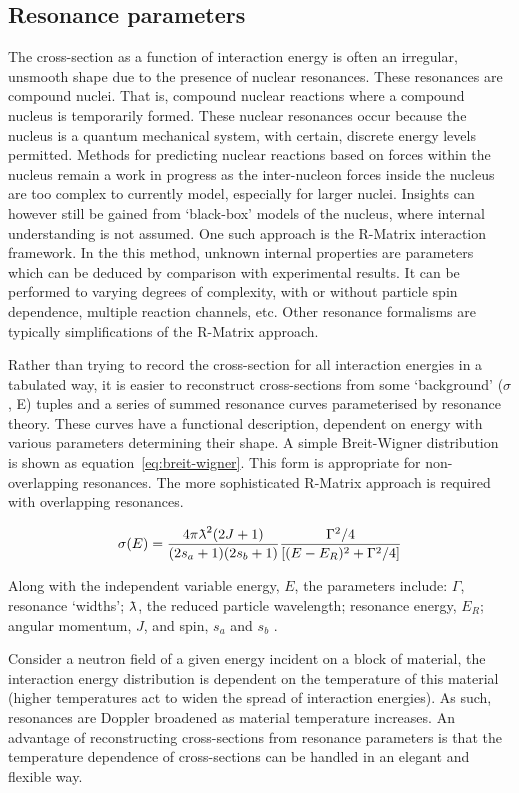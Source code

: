 \subsection{Resonance parameters}
The cross-section as a function of interaction energy is often an irregular, unsmooth shape due to the presence of nuclear resonances. These resonances are compound nuclei. That is, compound nuclear reactions where a compound nucleus is temporarily formed. These nuclear resonances occur because the nucleus is a quantum mechanical system, with certain, discrete energy levels permitted. Methods for predicting nuclear reactions based on forces within the nucleus remain a work in progress as the inter-nucleon forces inside the nucleus are too complex to currently model, especially for larger nuclei. Insights can however still be gained from `black-box' models of the nucleus, where internal understanding is not assumed. One such approach is the R-Matrix interaction framework. In the this method, unknown internal properties are parameters which can be deduced by comparison with experimental results. It can be performed to varying degrees of complexity, with or without particle spin dependence, multiple reaction channels, etc. Other resonance formalisms are typically simplifications of the R-Matrix approach.

Rather than trying to record the cross-section for all interaction energies in a tabulated way, it is easier to reconstruct cross-sections from some `background' ($\sigma$, E) tuples and a series of summed resonance curves parameterised by resonance theory. These curves have a functional description, dependent on energy with various parameters determining their shape. A simple Breit-Wigner distribution is shown as equation~\ref{eq:breit-wigner}. This form is appropriate for non-overlapping resonances. The more sophisticated R-Matrix approach is required with overlapping resonances. 

\begin{equation}
  \sigma(E) = \frac{4\pi\lambdabar^{2}(2J + 1)}{(2s_{a} + 1)(2s_{b} + 1)}  \frac{\Gamma^{2}/4}{[(E-E_{R})^{2} + \Gamma^{2}/4]}
  \label{eq:breit-wigner}
\end{equation}

Along with the independent variable energy, $E$, the parameters include: $\Gamma$, resonance `widths'; $\lambdabar$, the reduced particle wavelength; resonance energy, $E_{R}$; angular momentum, $J$, and spin, $s_{a}$ and $s_{b}$ \cite{Libby2005}. 

Consider a neutron field of a given energy incident on a block of material, the interaction energy distribution is dependent on the temperature of this material (higher temperatures act to widen the spread of interaction energies). As such, resonances are Doppler broadened as material temperature increases. An advantage of reconstructing cross-sections from resonance parameters is that the temperature dependence of cross-sections can be handled in an elegant and flexible way. 

